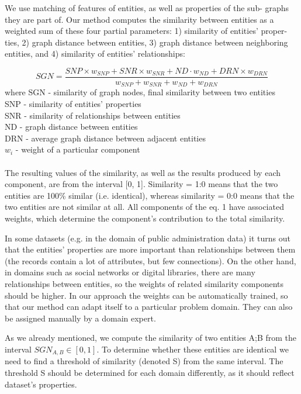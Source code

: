 \documentclass{llncs}
\begin{document}
We use matching of features of entities, as well as properties of the sub-
graphs they are part of. Our method computes the similarity between entities as
a weighted sum of these four partial parameters: 1) similarity of entities' proper-
ties, 2) graph distance between entities, 3) graph distance between neighboring
entities, and 4) similarity of entities' relationships:

\begin {equation}
SGN=\frac{SNP\times w_{SNP}+SNR\times w_{SNR}+ND \cdot  w_{ND}+DRN\times w_{DRN}}{w_{SNP} + w_{SNR} + w_{ND} + w_{DRN}}
\label{rov1}
\end {equation}
where
\newline
SGN - similarity of graph nodes, final similarity between two entities\\
SNP - similarity of entities' properties\\
SNR - similarity of relationships between entities\\
ND - graph distance between entities\\
DRN - average graph distance between adjacent entities\\
$w_i$ - weight of a particular component\\
\vspace{5mm} \\
The resulting values of the similarity, as well as the results produced by each
component, are from the interval [0, 1]. Similarity = 1:0 means that the two
entities are 100\%  similar (i.e. identical), whereas similarity = 0:0 means that the
two entities are not similar at all. All components of the eq. 1 have associated
weights, which determine the component's contribution to the total similarity.

In some datasets (e.g. in the domain of public administration data) it turns
out that the entities' properties are more important than relationships between
them (the records contain a lot of attributes, but few connections). On the other
hand, in domains such as social networks or digital libraries, there are many
relationships between entities, so the weights of related similarity components
should be higher. In our approach the weights can be automatically trained, so
that our method can adapt itself to a particular problem domain. They can also
be assigned manually by a domain expert.

As we already mentioned, we compute the similarity of two entities A;B from
the interval $SGN_{A,B} \in [0, 1]$. To determine whether these entities are identical
we need to find a threshold of similarity (denoted S) from the same interval.
The threshold S should be determined for each domain differently, as it should
reflect dataset's properties.
\end{document}
